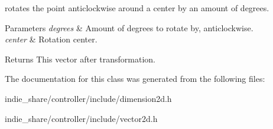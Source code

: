 rotates the point anticlockwise around a center by an amount of degrees. 


\begin{DoxyParams}{Parameters}
{\em degrees} & Amount of degrees to rotate by, anticlockwise. \\
\hline
{\em center} & Rotation center. \\
\hline
\end{DoxyParams}
\begin{DoxyReturn}{Returns}
This vector after transformation. 
\end{DoxyReturn}


The documentation for this class was generated from the following files\+:\begin{DoxyCompactItemize}
\item 
indie\+\_\+share/controller/include/dimension2d.\+h\item 
indie\+\_\+share/controller/include/vector2d.\+h\end{DoxyCompactItemize}
